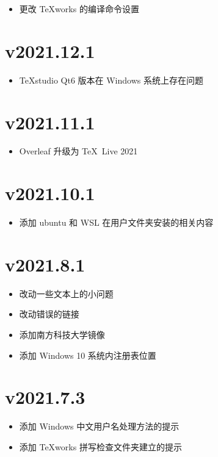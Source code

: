 \begin{itemize}
  \item 更改 \TeX works 的编译命令设置
\end{itemize}

\section*{v2021.12.1}

\begin{itemize}
  \item \TeX studio Qt6 版本在 Windows 系统上存在问题
\end{itemize}

\section*{v2021.11.1}

\begin{itemize}
  \item Overleaf 升级为 \TeX~Live 2021
\end{itemize}

\section*{v2021.10.1}

\begin{itemize}
  \item 添加 ubuntu 和 WSL 在用户文件夹安装的相关内容
\end{itemize}

\section*{v2021.8.1}

\begin{itemize}
  \item 改动一些文本上的小问题
  \item 改动错误的链接
  \item 添加南方科技大学镜像
  \item 添加 Windows 10 系统内注册表位置
\end{itemize}

\section*{v2021.7.3}

\begin{itemize}
  \item 添加 Windows 中文用户名处理方法的提示
  \item 添加 \TeX works 拼写检查文件夹建立的提示
\end{itemize}

